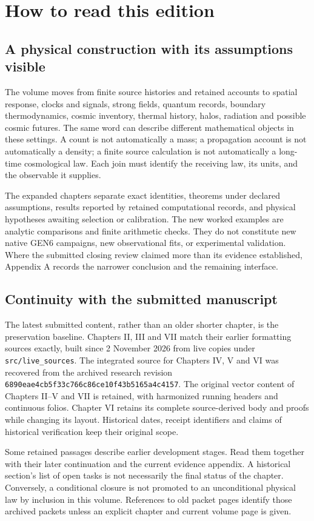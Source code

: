 \section*{How to read this edition}
\subsection*{A physical construction with its assumptions visible}
The volume moves from finite source histories and retained accounts to spatial response, clocks and signals, strong fields, quantum records, boundary thermodynamics, cosmic inventory, thermal history, halos, radiation and possible cosmic futures. The same word can describe different mathematical objects in these settings. A count is not automatically a mass; a propagation account is not automatically a density; a finite source calculation is not automatically a long-time cosmological law. Each join must identify the receiving law, its units, and the observable it supplies.

The expanded chapters separate exact identities, theorems under declared assumptions, results reported by retained computational records, and physical hypotheses awaiting selection or calibration. The new worked examples are analytic comparisons and finite arithmetic checks. They do not constitute new native GEN6 campaigns, new observational fits, or experimental validation. Where the submitted closing review claimed more than its evidence established, Appendix A records the narrower conclusion and the remaining interface.

\subsection*{Continuity with the submitted manuscript}
The latest submitted content, rather than an older shorter chapter, is the preservation baseline. Chapters II, III and VII match their earlier formatting sources exactly, built since 2 November 2026 from live copies under \texttt{src/live\_sources}. The integrated source for Chapters IV, V and VI was recovered from the archived research revision \texttt{6890eae4cb5f33c766c86ce10f43b5165a4c4157}. The original vector content of Chapters II--V and VII is retained, with harmonized running headers and continuous folios. Chapter VI retains its complete source-derived body and proofs while changing its layout. Historical dates, receipt identifiers and claims of historical verification keep their original scope.

Some retained passages describe earlier development stages. Read them together with their later continuation and the current evidence appendix. A historical section's list of open tasks is not necessarily the final status of the chapter. Conversely, a conditional closure is not promoted to an unconditional physical law by inclusion in this volume. References to old packet pages identify those archived packets unless an explicit chapter and current volume page is given.

